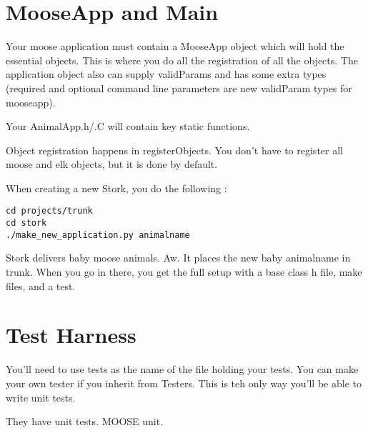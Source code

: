 \section{MooseApp and Main}
Your moose application must contain a MooseApp object which will hold the 
essential objects. This is where you do all the registration of all the objects. 
The application object also can supply validParams and has some extra types 
(required and optional command line parameters are new validParam types for 
mooseapp).

Your AnimalApp.h/.C will contain key static functions. 

Object registration happens in registerObjects. You don't have to register all 
moose and elk objects, but it is done by default. 

When creating a new Stork, you do the following :

\begin{verbatim}
cd projects/trunk
cd stork
./make_new_application.py animalname
\end{verbatim}

Stork delivers baby moose animals. Aw. It places the new baby animalname in 
trunk.  When you go in there, you get the full setup with a base class h file, 
make files, and a test. 

\section{Test Harness}
You'll need to use tests as the name of the file holding your tests. You can 
make your own tester if you inherit from Testers. This is teh only way you'll be 
able to write unit tests. 

They have unit tests. MOOSE unit. 
